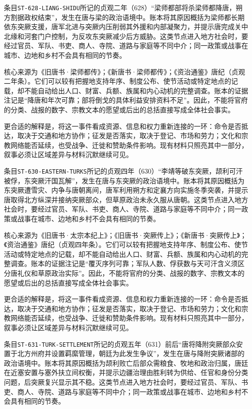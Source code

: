 条目\texttt{ST-628-LIANG-SHIDU}所记的贞观二年（628）“梁师都部将杀梁师都降唐，朔方割据政权结束”，发生在唐与梁的政治语境中。账本将其原因概括为梁师都长期依东突厥支援，唐军北进与突厥内压削弱其外援和内部凝聚力，并提示唐完成关中北缘和河套门户控制，为反攻东突厥减少后方威胁。这类节点进入地方社会时，要经过官员、军队、书吏、商人、寺院、道路与家庭等不同中介；同一政策或战事在城市、边地和乡村不会具有相同的节奏。

核心来源为《旧唐书·梁师都传》；《新唐书·梁师都传》；《资治通鉴》唐纪（贞观二年条）。它们可以较有把握地支持年序、制度公布、使节活动或特定地点的记载，却不能自动给出人口、财富、兵额、族属和内心动机的完整调查。账本的证据注记是“降唐和年次可靠；部将倒戈的具体利益安排资料不足”。因此，不能将官府的分类、战报的数字、宗教文本的愿望或后出的总括直接写成全体社会事实。

更合适的解释是，将这一事件看成资源、信息和权力重新连接的一环：命令是否抵达，取决于交通和地方协作；征发是否落实，取决于登记、市场和劳力；文化和宗教网络能否延续，也受战争、迁徙和赞助条件影响。现有材料只照亮其中一部分，叙事必须让区域差异与材料沉默继续可见。

条目\texttt{ST-630-EASTERN-TURKS}所记的贞观四年（630）“李靖等破东突厥，颉利可汗被俘，东突厥汗国瓦解”，发生在唐与东突厥的政治语境中。账本将其原因概括为东突厥遭雪灾、内争与唐朝离间，唐军利用朔方和定襄方向实施冬季突袭，并提示唐取得北方纵深并接纳突厥部众，但草原政治未永久服从唐朝。这类节点进入地方社会时，要经过官员、军队、书吏、商人、寺院、道路与家庭等不同中介；同一政策或战事在城市、边地和乡村不会具有相同的节奏。

核心来源为《旧唐书·太宗本纪上》；《旧唐书·突厥传上》；《新唐书·突厥传上》；《资治通鉴》唐纪（贞观四年条）。它们可以较有把握地支持年序、制度公布、使节活动或特定地点的记载，却不能自动给出人口、财富、兵额、族属和内心动机的完整调查。账本的证据注记是“覆灭序列可靠；军队人数、俘获数与天可汗含义须区分唐礼仪和草原政治实际”。因此，不能将官府的分类、战报的数字、宗教文本的愿望或后出的总括直接写成全体社会事实。

更合适的解释是，将这一事件看成资源、信息和权力重新连接的一环：命令是否抵达，取决于交通和地方协作；征发是否落实，取决于登记、市场和劳力；文化和宗教网络能否延续，也受战争、迁徙和赞助条件影响。现有材料只照亮其中一部分，叙事必须让区域差异与材料沉默继续可见。

条目\texttt{ST-631-TURK-SETTLEMENT}所记的贞观五年（631）前后“唐将降附突厥部众安置于北方州府并设置羁縻管理，朝廷为此发生争议”，发生在唐与降附突厥诸部的政治语境中。账本将其原因概括为颉利败亡后部众需粮食、牧地和政治归属，唐廷在近塞安置与塞外扶立间权衡，并提示边疆治理由胜利转为供给、任官和身份分类问题，后突厥复兴显示其不稳。这类节点进入地方社会时，要经过官员、军队、书吏、商人、寺院、道路与家庭等不同中介；同一政策或战事在城市、边地和乡村不会具有相同的节奏。

